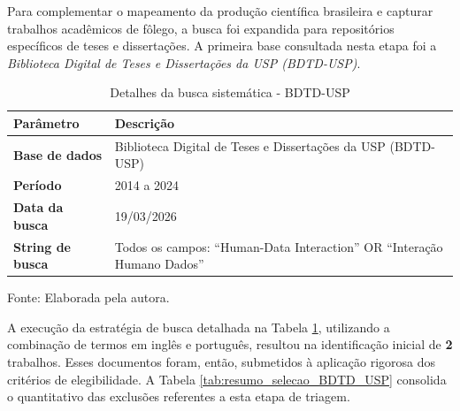 \documentclass[
	12pt,				%
	oneside,			%
	a4paper,			%
	english,			%
	brazil				%
	]{abntex2ppgsi}
\begin{document}
    Para complementar o mapeamento da produção científica brasileira e capturar trabalhos acadêmicos de fôlego, a busca foi expandida para repositórios específicos de teses e dissertações. A primeira base consultada nesta etapa foi a \textit{Biblioteca Digital de Teses e Dissertações da USP (BDTD-USP)}.

\begin{table}[htbp]
\centering
\caption{Detalhes da busca sistemática - BDTD-USP}
\label{tab:detalhes_busca_usp}
\renewcommand{\arraystretch}{1.4} 
\begin{tabular}{@{} >{\bfseries}p{3.5cm} p{11cm} @{}}
\toprule
Parâmetro & Descrição \\
\midrule
Base de dados & Biblioteca Digital de Teses e Dissertações da USP (BDTD-USP) \\
Período & 2014 a 2024 \\
Data da busca & 19/03/2026 \\
String de busca & Todos os campos: ``Human-Data Interaction'' OR ``Interação Humano Dados''\\
\bottomrule
\end{tabular}

\vspace{0.2cm} 
{\small Fonte: Elaborada pela autora.}
\end{table}

    A execução da estratégia de busca detalhada na Tabela \ref{tab:detalhes_busca_usp}, utilizando a combinação de termos em inglês e português, resultou na identificação inicial de \textbf{2} trabalhos. Esses documentos foram, então, submetidos à aplicação rigorosa dos critérios de elegibilidade. A Tabela \ref{tab:resumo_selecao_BDTD_USP} consolida o quantitativo das exclusões referentes a esta etapa de triagem.
\end{document}
